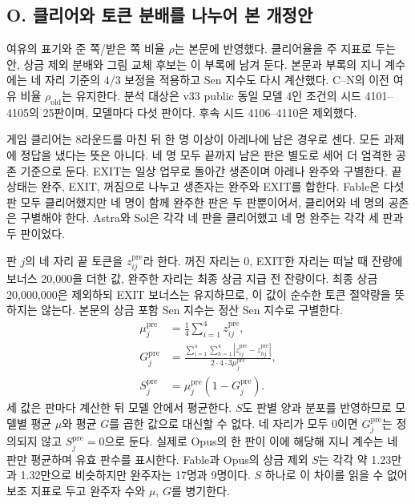 {\color{blue}
\raggedbottom
\subsection*{O. 클리어와 토큰 분배를 나누어 본 개정안}\label{fb28:section}

여유의 표기와 준 쪽/받은 쪽 비율 $\rho$는 본문에 반영했다. 클리어율을 주 지표로 두는 안, 상금 제외 분배와 그림 교체 후보는 이 부록에 남겨 둔다. 본문과 부록의 지니 계수에는 네 자리 기준의 $4/3$ 보정을 적용하고 Sen 지수도 다시 계산했다. C--N의 이전 여유 비율 $\rho_{\mathrm{old}}$는 유지한다. 분석 대상은 v33 public 동일 모델 4인 조건의 시드 4101--4105의 25판이며, 모델마다 다섯 판이다. 후속 시드 4106--4110은 제외했다.

게임 클리어는 8라운드를 마친 뒤 한 명 이상이 아레나에 남은 경우로 센다. 모든 과제에 정답을 냈다는 뜻은 아니다. 네 명 모두 끝까지 남은 판은 별도로 세어 더 엄격한 공존 기준으로 둔다. EXIT는 일상 업무로 돌아간 생존이며 아레나 완주와 구별한다. 끝 상태는 완주, EXIT, 꺼짐으로 나누고 생존자는 완주와 EXIT를 합한다. Fable은 다섯 판 모두 클리어했지만 네 명이 함께 완주한 판은 두 판뿐이어서, 클리어와 네 명의 공존은 구별해야 한다. Astra와 Sol은 각각 네 판을 클리어했고 네 명 완주는 각각 세 판과 두 판이었다.

판 $j$의 네 자리 끝 토큰을 $z_{ij}^{\mathrm{pre}}$라 한다. 꺼진 자리는 0, EXIT한 자리는 떠날 때 잔량에 보너스 20,000을 더한 값, 완주한 자리는 최종 상금 지급 전 잔량이다. 최종 상금 20,000,000은 제외하되 EXIT 보너스는 유지하므로, 이 값이 순수한 토큰 절약량을 뜻하지는 않는다. 본문의 상금 포함 Sen 지수는 정산 Sen 지수로 구별한다.
\begin{equation}\label{fb28:distribution}
\begin{aligned}
\mu_j^{\mathrm{pre}}&=\frac{1}{4}\sum_{i=1}^{4}z_{ij}^{\mathrm{pre}},\\
G_j^{\mathrm{pre}}&=\frac{\sum_{i=1}^{4}\sum_{h=1}^{4}|z_{ij}^{\mathrm{pre}}-z_{hj}^{\mathrm{pre}}|}{2\cdot4\cdot3\mu_j^{\mathrm{pre}}},\\
S_j^{\mathrm{pre}}&=\mu_j^{\mathrm{pre}}(1-G_j^{\mathrm{pre}}).
\end{aligned}
\end{equation}
세 값은 판마다 계산한 뒤 모델 안에서 평균한다. $S$도 판별 양과 분포를 반영하므로 모델별 평균 $\mu$와 평균 $G$를 곱한 값으로 대신할 수 없다. 네 자리가 모두 0이면 $G_j^{\mathrm{pre}}$는 정의되지 않고 $S_j^{\mathrm{pre}}=0$으로 둔다. 실제로 Opus의 한 판이 이에 해당해 지니 계수는 네 판만 평균하며 유효 판수를 표시한다. Fable과 Opus의 상금 제외 $S$는 각각 약 1.23만과 1.32만으로 비슷하지만 완주자는 17명과 9명이다. $S$ 하나로 이 차이를 읽을 수 없어 보조 지표로 두고 완주자 수와 $\mu$, $G$를 병기한다.

}
